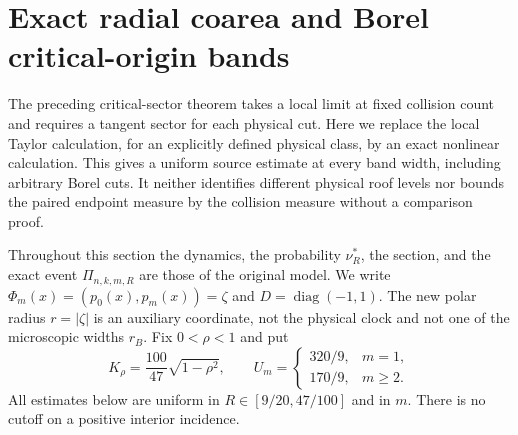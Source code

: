 \section{Exact radial coarea and Borel critical-origin bands}
\label{sec:rc-main}
The preceding critical-sector theorem takes a local limit at fixed
collision count and requires a tangent sector for each physical cut.
Here we replace the local Taylor calculation, for an explicitly defined
physical class, by an exact nonlinear calculation. This gives a uniform
source estimate at every band width, including arbitrary Borel cuts. It
neither identifies different physical roof levels nor bounds the paired
endpoint measure by the collision measure without a comparison proof.

Throughout this section the dynamics, the probability $\nu_R^*$, the
section, and the exact event $\Pi_{n,k,m,R}$ are those of the original
model. We write $\Phi_m(x)=(p_0(x),p_m(x))=\zeta$ and
$D=\operatorname{diag}(-1,1)$. The new polar radius $r=|\zeta|$ is
an auxiliary coordinate, not the physical clock and not one of the
microscopic widths $r_B$. Fix $0<\rho<1$ and put
\begin{equation}\label{eq:rc-constants}
 K_\rho=\frac{100}{47}\sqrt{1-\rho^2},\qquad
 U_m=\begin{cases}320/9,&m=1,\\170/9,&m\ge2.\end{cases}
\end{equation}
All estimates below are uniform in $R\in[9/20,47/100]$ and in $m$.
There is no cutoff on a positive interior incidence.

